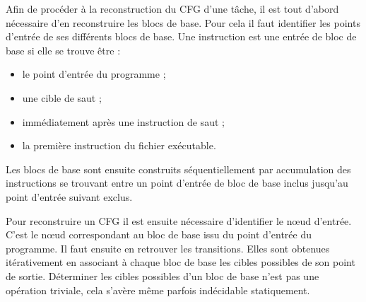     \vspace{1em}
    

    Afin de procéder à la reconstruction du CFG d'une tâche, il est tout d'abord
    nécessaire d'en reconstruire les blocs de base. Pour cela il faut identifier
    les points d'entrée de ses différents blocs de base. Une instruction est une
    entrée de bloc de base si elle se trouve être :
    
    \begin{itemize}
      \item le point d'entrée du programme ;
      \item une cible de saut ;
      \item immédiatement après une instruction de saut ;
      \item la première instruction du fichier exécutable.
    \end{itemize}
    
    Les blocs de base sont ensuite construits séquentiellement par accumulation
    des instructions se trouvant entre un point d'entrée de bloc de base inclus
    jusqu'au point d'entrée suivant exclus.
  
    
    Pour reconstruire un CFG il est ensuite nécessaire d'identifier le n{\oe}ud
    d'entrée. C'est le n{\oe}ud correspondant au bloc de base issu du point
    d'entrée du programme. Il faut ensuite en retrouver les transitions. Elles
    sont obtenues itérativement en associant à chaque bloc de base les cibles
    possibles de son point de sortie. Déterminer les cibles possibles d'un bloc
    de base n'est pas une opération triviale, cela s'avère même parfois
    indécidable statiquement.
